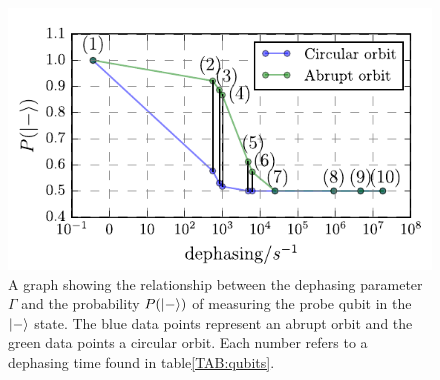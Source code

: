 \begin{figure}[h]
	\centering
	\includegraphics[width=1.05\linewidth]{../Figures/dephasing.pdf}
		\caption{A graph showing the relationship between the dephasing parameter $\Gamma$ and the probability $P(\ket{-})$ of measuring the probe qubit in the $\ket{-}$ state.  The blue data points represent an abrupt orbit and the green data points a circular orbit. Each number refers to a dephasing time found in table\@ \ref{TAB:qubits}. }
		\label{fig:dephasingplot}
\end{figure}





